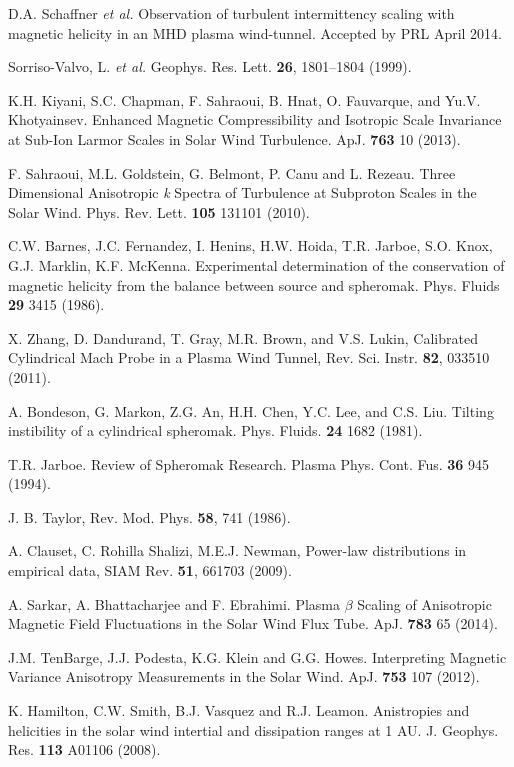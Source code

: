 \documentclass[aps,prl,amsmath,amssymb,reprint,superscriptaddress]{revtex4-1} %
\begin{document}
\begin{thebibliography}{99}
 D.A. Schaffner {\it et al.} Observation of turbulent intermittency scaling with magnetic helicity in an MHD plasma wind-tunnel. Accepted by PRL April 2014.

Sorriso-Valvo, L. {\it et al.} Geophys. Res. Lett. {\bf 26}, 1801–1804 (1999).

 K.H. Kiyani, S.C. Chapman, F. Sahraoui, B. Hnat, O. Fauvarque, and Yu.V. Khotyainsev. Enhanced Magnetic Compressibility and Isotropic Scale Invariance at Sub-Ion Larmor Scales in Solar Wind Turbulence. ApJ. {\bf 763} 10 (2013).

 F. Sahraoui, M.L. Goldstein, G. Belmont, P. Canu and L. Rezeau. Three Dimensional Anisotropic {\it k} Spectra of Turbulence at Subproton Scales in the Solar Wind. Phys. Rev. Lett. {\bf 105} 131101 (2010).

C.W. Barnes, J.C. Fernandez, I. Henins, H.W. Hoida, T.R. Jarboe, S.O. Knox, G.J. Marklin, K.F. McKenna. Experimental determination of the conservation of magnetic helicity from the balance between source and spheromak. Phys. Fluids {\bf 29} 3415 (1986).

 X. Zhang, D. Dandurand, T. Gray, M.R. Brown, and V.S. Lukin, Calibrated Cylindrical Mach Probe in a Plasma Wind Tunnel, Rev. Sci. Instr. {\bf 82}, 033510 (2011).

 A. Bondeson, G. Markon, Z.G. An, H.H. Chen, Y.C. Lee, and C.S. Liu. Tilting instibility of a cylindrical spheromak. Phys. Fluids. {\bf 24} 1682 (1981).

T.R. Jarboe. Review of Spheromak Research. Plasma Phys. Cont. Fus. {\bf 36} 945 (1994).

 J. B. Taylor, Rev. Mod. Phys. {\bf 58}, 741 (1986).

A. Clauset, C. Rohilla Shalizi, M.E.J. Newman, Power-law distributions in empirical data, SIAM Rev. {\bf 51}, 661703 (2009).

A. Sarkar, A. Bhattacharjee and F. Ebrahimi. Plasma $\beta$ Scaling of Anisotropic Magnetic Field Fluctuations in the Solar Wind Flux Tube. ApJ. {\bf 783} 65 (2014).

 J.M. TenBarge, J.J. Podesta, K.G. Klein and G.G. Howes. Interpreting Magnetic Variance Anisotropy Measurements in the Solar Wind. ApJ. {\bf 753} 107 (2012).

 K. Hamilton, C.W. Smith, B.J. Vasquez and R.J. Leamon. Anistropies and helicities in the solar wind intertial and dissipation ranges at 1 AU. J. Geophys. Res. {\bf 113} A01106 (2008).


\end{thebibliography}
\end{document}
